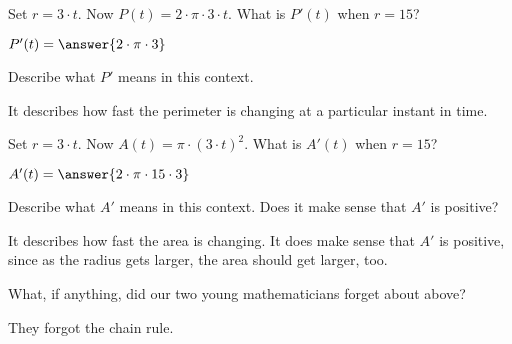 \documentclass{ximera}
\begin{document}
\begin{problem}
  Set $r=3\cdot t$. Now $P(t) = 2\cdot \pi\cdot 3\cdot t$. What is
  $P'(t)$ when $r=15$?
  \begin{prompt}
    $P'(t)=\answer{2\cdot \pi\cdot 3}$
  \end{prompt}
\end{problem}

\begin{problem}
  Describe what $P'$ means in this context.
  \begin{freeResponse}
    It describes how fast the perimeter is changing at a particular
    instant in time.
  \end{freeResponse}
\end{problem}

\begin{problem}
  Set $r=3\cdot t$. Now $A(t) = \pi\cdot (3\cdot t)^2$. What is
  $A'(t)$ when $r=15$?
  \begin{prompt}
    $A'(t)=\answer{2\cdot\pi\cdot 15\cdot 3}$
  \end{prompt}
\end{problem}

\begin{problem}
  Describe what $A'$ means in this context.  Does it make sense that
  $A'$ is positive?
  \begin{freeResponse}
    It describes how fast the area is changing.  It does make sense that
    $A'$ is positive, since as the radius gets larger, the area should
    get larger, too.
  \end{freeResponse}
\end{problem}

\begin{problem}
  What, if anything, did our two young mathematicians forget about above?
  \begin{freeResponse}
 They forgot the chain rule.
  \end{freeResponse}
\end{problem}

%
\end{document}
